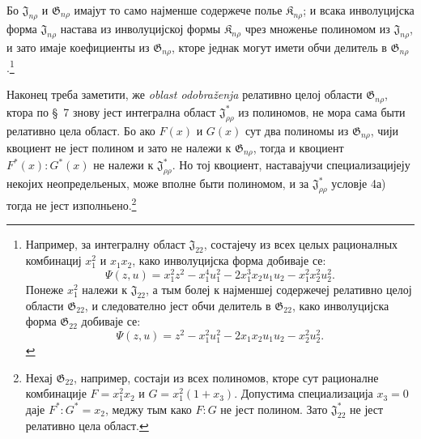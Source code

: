 ﻿\documentclass[11pt]{article}
\providecommand{\Kfield}{\mathfrak{K}}
\providecommand{\Jdom}{\mathfrak{J}}
\providecommand{\Gdom}{\mathfrak{G}}
\begin{document}
Бо $\Jdom_{n\rho}$ и $\Gdom_{n\rho}$ имајут то само најменше содержече полье $\Kfield_{n\rho}$; и всака инволуцијска форма $\Jdom_{n\rho}$ настава из инволуцијској формы $\Kfield_{n\rho}$ чрез множенье полиномом из $\Jdom_{n\rho}$, и зато имаје коефициенты из $\Gdom_{n\rho}$, кторе једнак могут имети обчи делитель в $\Gdom_{n\rho}$.\footnote{Например, за интегралну област $\Jdom_{22}$, состајечу из всех целых рационалных комбинациј $x_1^2$ и $x_1x_2$, како инволуцијска форма добиваје се:
\[
\Psi(z,u)=x_1^2z^2-x_1^4u_1^2-2x_1^3x_2u_1u_2-x_1^2x_2^2u_2^2.
\]
Понеже $x_1^2$ належи к $\Jdom_{22}$, а тым болеј к најменшеј содержечеј релативно целој области $\Gdom_{22}$, и следователно јест обчи делитель в $\Gdom_{22}$, како инволуцијска форма $\Gdom_{22}$ добиваје се:
\[
\Psi(z,u)=z^2-x_1^2u_1^2-2x_1x_2u_1u_2-x_2^2u_2^2.
\]}

Наконец треба заметити, же \emph{oblast odobraženja} релативно целој области $\Gdom_{n\rho}$, ктора по \S\ 7 знову јест интегрална област $\Jdom^*_{\rho\rho}$ из полиномов, не мора сама быти релативно цела област. Бо ако $F(x)$ и $G(x)$ сут два полиномы из $\Gdom_{n\rho}$, чији квоциент не јест полином и зато не належи к $\Gdom_{n\rho}$, тогда и квоциент $F^*(x):G^*(x)$ не належи к $\Jdom^*_{\rho\rho}$. Но тој квоциент, наставајучи специализацијеју некојих неопредельеных, може вполне быти полиномом, и за $\Jdom^*_{\rho\rho}$ условје 4а) тогда не јест изполньено.\footnote{Нехај $\Gdom_{22}$, например, состаји из всех полиномов, кторе сут рационалне комбинације $F=x_1^2x_2$ и $G=x_1^2(1+x_3)$. Допустима специализација $x_3=0$ даје $F^*:G^*=x_2$, меджу тым како $F:G$ не јест полином. Зато $\Jdom^*_{22}$ не јест релативно цела област.}
\end{document}
